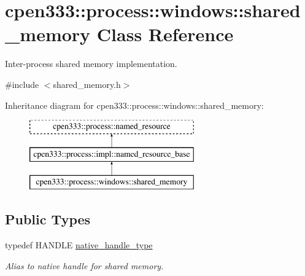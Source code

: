 \hypertarget{classcpen333_1_1process_1_1windows_1_1shared__memory}{}\section{cpen333\+:\+:process\+:\+:windows\+:\+:shared\+\_\+memory Class Reference}
\label{classcpen333_1_1process_1_1windows_1_1shared__memory}


Inter-\/process shared memory implementation.  




{\ttfamily \#include $<$shared\+\_\+memory.\+h$>$}

Inheritance diagram for cpen333\+:\+:process\+:\+:windows\+:\+:shared\+\_\+memory\+:\begin{figure}[H]
\begin{center}
\leavevmode
\includegraphics[height=3.000000cm]{classcpen333_1_1process_1_1windows_1_1shared__memory}
\end{center}
\end{figure}
\subsection*{Public Types}
\begin{DoxyCompactItemize}
\item 
\mbox{\label{classcpen333_1_1process_1_1windows_1_1shared__memory_a4a2507680675101666846b0975fa6899}} 
typedef H\+A\+N\+D\+LE \hyperlink{classcpen333_1_1process_1_1windows_1_1shared__memory_a4a2507680675101666846b0975fa6899}{native\+\_\+handle\+\_\+type}
\begin{DoxyCompactList}\small\item\em Alias to native handle for shared memory. \end{DoxyCompactList}\end{DoxyCompactItemize}
